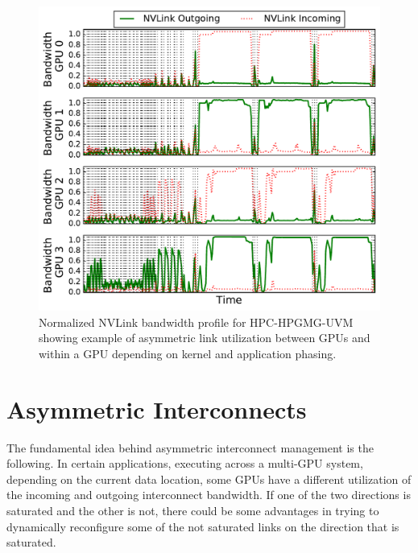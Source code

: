 \begin{figure}[t]
    \centering
    \includegraphics[width=1.0\columnwidth]{figures/bw_profile_HPGMG_UVM_base.pdf}
    \caption{Normalized NVLink bandwidth profile for HPC-HPGMG-UVM showing example of asymmetric 
    link utilization between GPUs and within a GPU depending on kernel and application phasing.}
    \label{fig:link-motivation}
\end{figure}

\section{Asymmetric Interconnects}
\label{interconnect}

The fundamental idea behind asymmetric interconnect management is the following.
In certain applications, executing across a multi-GPU system, 
depending on the current data location, some GPUs have a different utilization 
of the incoming and outgoing interconnect bandwidth. If one of the two directions
is saturated and the other is not, there could be some advantages in trying to 
dynamically reconfigure some of the not saturated links on the direction 
that is saturated.

